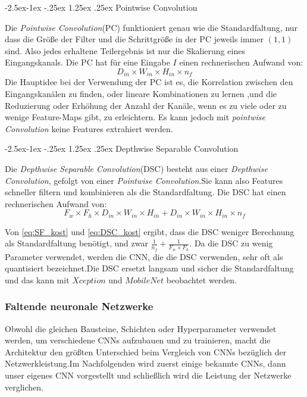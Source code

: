\documentclass[12pt,a4paper]{scrartcl}
\makeatletter
\numberwithin{equation}{section}
\renewcommand\paragraph{\@startsection{paragraph}{4}{\z@}%
	{-2.5ex\@plus -1ex \@minus -.25ex}%
	{1.25ex \@plus .25ex}%
	{\normalfont\normalsize\bfseries}}
\makeatother
\begin{document}
\paragraph{Pointwise Convolution}\label{Pointwise}

Die \textit{Pointwise Convolution}(PC) funktioniert genau wie die Standardfaltung, nur dass die Größe der Filter und die Schrittgröße in der PC jeweils immer $ (1,1) $ sind. Also jedes erhaltene Teilergebnis ist nur die Skalierung eines Eingangskanals. Die PC hat für eine Eingabe $ I $ einen rechnerischen Aufwand von:
\begin{equation}\label{eq:PT_kost}
	 D_{in}\times W_{in}\times H_{in} \times n_f
\end{equation}
Die Hauptidee bei der Verwendung der PC ist es, die Korrelation zwischen den Eingangskanälen zu finden, oder lineare Kombinationen zu lernen ,und  die Reduzierung oder Erhöhung der Anzahl der Kanäle, wenn es zu viele oder zu wenige Feature-Maps gibt, zu erleichtern. Es kann jedoch mit \textit{pointwise Convolution} keine Features extrahiert werden.

\paragraph{Depthwise Separable Convolution} \label{DSC}

Die \textit{Depthwise Separable Convolution}(DSC) besteht aus einer \textit{Depthwise Convolution}, gefolgt von einer \textit{Pointwise Convolution}.Sie kann also Features schneller filtern und kombinieren als die Standardfaltung. Die DSC hat einen rechnerischen Aufwand von:
\begin{equation}\label{eq:DSC_kost}
F_w\times F_h \times D_{in}\times W_{in}\times H_{in} + D_{in}\times W_{in}\times H_{in} \times n_f
\end{equation}

Von \ref{eq:SF_kost} und \ref{eq:DSC_kost} ergibt, dass die DSC weniger Berechnung als Standardfaltung benötigt, und zwar $ \frac{1}{n_f} + \frac{1}{F_w\times F_h}$. Da die DSC zu wenig Parameter verwendet, werden die \ac{CNN}, die die DSC verwenden, sehr oft als quantisiert bezeichnet.Die DSC ersetzt langsam und sicher die Standardfaltung und das kann mit $ Xception $ und $ MobileNet $ beobachtet werden.

\subsubsection{Faltende neuronale Netzwerke}\label{CNN}
Obwohl die gleichen Bausteine, Schichten oder Hyperparameter verwendet werden, um verschiedene \acsp{CNN} aufzubauen und zu trainieren, macht die Architektur den größten Unterschied beim Vergleich von {CNNs} bezüglich der Netzwerkleistung.Im Nachfolgenden wird zuerst einige bekannte \acsp{CNN}, dann unser eigenes {CNN} vorgestellt und schließlich wird die Leistung der Netzwerke verglichen.
\end{document}
